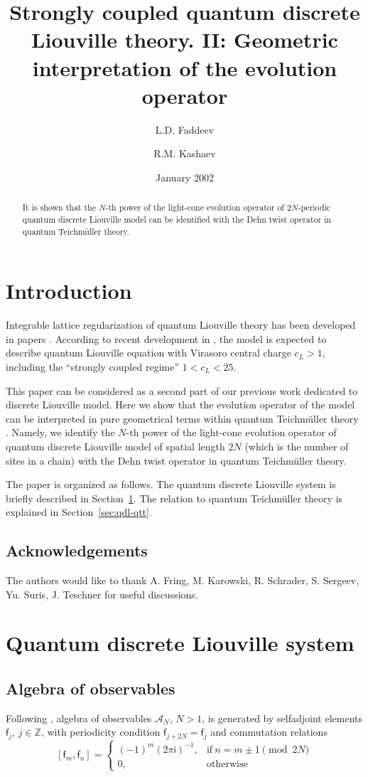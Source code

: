 \documentclass[a4paper,draft]{amsart}
\title[Strongly coupled quantum discrete Liouville theory]{Strongly
coupled quantum discrete Liouville theory. II:
Geometric interpretation of the evolution operator}
\author{L.D. Faddeev}
\author{R.M. Kashaev}
\date{January 2002}
\theoremstyle{definition}
\theoremstyle{remark}
\newcommand{\GEN}{\mathsf f}
\newcommand{\IMUN}{\mathsf i}
\newcommand{\INTEGERS}{\mathbb Z}
\newcommand{\OBALG}{\mathcal A_{N}}
\begin{document}
\begin{abstract}
  It is shown that the $N$-th power of the light-cone
  evolution operator of $2N$-periodic quantum discrete Liouville model
can be identified with the 
Dehn twist operator in quantum Teichm\"uller theory. 
\end{abstract}
\maketitle


\section*{Introduction}

Integrable lattice regularization
of quantum Liouville theory has been developed in
papers \cite{fadtak,faddeev91,fadVol97}. According to recent development
in \cite{fkv}, the model is expected to describe quantum
Liouville equation with Virasoro central charge $c_L>1$, including
the ``strongly coupled regime'' $1<c_L<25$.
 
This paper can be considered as a second part of our previous work \cite{fkv} 
dedicated to discrete Liouville model. Here we show that the evolution
operator of the 
model can be interpreted in pure geometrical terms within
quantum Teichm\"uller theory
\cite{fock2,fock1,kash1,kash2,kash3}. 
Namely, we identify  the $N$-th power of the
light-cone evolution operator of quantum discrete Liouville model of
spatial length $2N$ (which is the number of sites in a chain) with the
Dehn twist operator in quantum Teichm\"uller theory. 
 
The paper is organized as follows.  The quantum discrete Liouville
system is briefly described in Section~\ref{sec:qdls}.  The
relation to quantum Teichm\"uller theory is explained in
Section~\ref{sec:qdl-qtt}. 
\subsection*{Acknowledgements}
The authors would like to thank A. Fring, M. Karowski,
   R. Schrader, S. Sergeev, Yu. Suris, J. Teschner
   for useful discussions.

\section{Quantum discrete Liouville system}
\label{sec:qdls}

\subsection{Algebra of observables}
Following \cite{fkv}, algebra of observables $\OBALG$, $N> 1$, is 
generated by selfadjoint elements
$\GEN_j$, $j\in\INTEGERS$, with periodicity condition
\(
\GEN_{j+2N}=\GEN_j
\)
and commutation relations
\begin{equation}\label{eq:com-rel}
[\GEN_m,\GEN_{n}]=\left\{
\begin{array}{cl}
(-1)^m(2\pi\IMUN)^{-1},&\mathrm{if}\ n=m\pm1\pmod{2N}\\
0,&\mathrm{otherwise}
\end{array}\right.
\end{equation}
\end{document}
